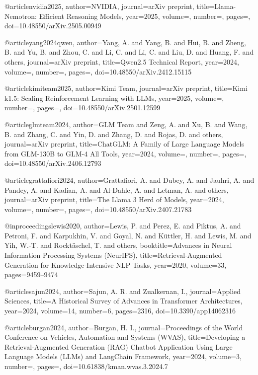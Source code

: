@article{nvidia2025,
  author={NVIDIA},
  journal={arXiv preprint},
  title={Llama-Nemotron: Efficient Reasoning Models},
  year={2025},
  volume={},
  number={},
  pages={},
  doi={10.48550/arXiv.2505.00949}
}

@article{yang2024qwen,
  author={Yang, A. and Yang, B. and Hui, B. and Zheng, B. and Yu, B. and Zhou, C. and Li, C. and Li, C. and Liu, D. and Huang, F. and others},
  journal={arXiv preprint},
  title={Qwen2.5 Technical Report},
  year={2024},
  volume={},
  number={},
  pages={},
  doi={10.48550/arXiv.2412.15115}
}

@article{kimiteam2025,
  author={Kimi Team},
  journal={arXiv preprint},
  title={Kimi k1.5: Scaling Reinforcement Learning with LLMs},
  year={2025},
  volume={},
  number={},
  pages={},
  doi={10.48550/arXiv.2501.12599}
}

@article{glmteam2024,
  author={GLM Team and Zeng, A. and Xu, B. and Wang, B. and Zhang, C. and Yin, D. and Zhang, D. and Rojas, D. and others},
  journal={arXiv preprint},
  title={ChatGLM: A Family of Large Language Models from GLM-130B to GLM-4 All Tools},
  year={2024},
  volume={},
  number={},
  pages={},
  doi={10.48550/arXiv.2406.12793}
}

@article{grattafiori2024,
  author={Grattafiori, A. and Dubey, A. and Jauhri, A. and Pandey, A. and Kadian, A. and Al-Dahle, A. and Letman, A. and others},
  journal={arXiv preprint},
  title={The Llama 3 Herd of Models},
  year={2024},
  volume={},
  number={},
  pages={},
  doi={10.48550/arXiv.2407.21783}
}

@inproceedings{lewis2020,
  author={Lewis, P. and Perez, E. and Piktus, A. and Petroni, F. and Karpukhin, V. and Goyal, N. and Küttler, H. and Lewis, M. and Yih, W.-T. and Rocktäschel, T. and others},
  booktitle={Advances in Neural Information Processing Systems (NeurIPS)},
  title={Retrieval-Augmented Generation for Knowledge-Intensive {NLP} Tasks},
  year={2020},
  volume={33},
  pages={9459--9474}
}

@article{sajun2024,
  author={Sajun, A. R. and Zualkernan, I.},
  journal={Applied Sciences},
  title={A Historical Survey of Advances in Transformer Architectures},
  year={2024},
  volume={14},
  number={6},
  pages={2316},
  doi={10.3390/app14062316}
}

@article{burgan2024,
  author={Burgan, H. I.},
  journal={Proceedings of the World Conference on Vehicles, Automation and Systems (WVAS)},
  title={Developing a Retrieval-Augmented Generation ({RAG}) Chatbot Application Using Large Language Models ({LLMs}) and {LangChain} Framework},
  year={2024},
  volume={3},
  number={},
  pages={},
  doi={10.61838/kman.wvas.3.2024.7}
}

